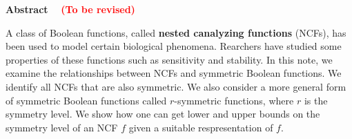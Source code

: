 \vspace*{-0.05in}
\begin{center}
\textbf{Abstract}~~ \textcolor{red}{\textbf{(To be revised)}}
\end{center}

\smallskip

A class of Boolean functions, 
called \textbf{nested canalyzing functions} (NCFs),
has been used to model certain biological phenomena.
Rearchers have studied some properties of these functions
such as sensitivity and stability.
In this note, we examine the relationships between NCFs and symmetric 
Boolean functions. 
We identify all NCFs that are also symmetric. 
We also consider a more general form of symmetric Boolean functions
called $r$-symmetric functions, where $r$ is the symmetry level.
We show how one can get lower and upper bounds on the symmetry
level of an NCF $f$ given a suitable respresentation of $f$.  


